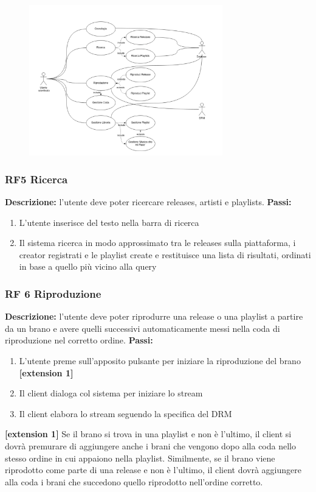 \documentclass[a4paper,12pt]{article}
\begin{document}
\begin{figure}[htp]
    \centering
    \includegraphics[width=0.75\textwidth]{diagrams/use-case-5-6-7-8-9-10-11-12-13.png}
\end{figure}

\subsubsection*{RF5 Ricerca}
\textbf{Descrizione:} l’utente deve poter ricercare releases, artisti e playlists. \newline
\textbf{Passi:}
\begin{enumerate}
    \item L’utente inserisce del testo nella barra di ricerca
    \item Il sistema ricerca in modo approssimato tra le releases sulla piattaforma, i creator registrati e le playlist create e restituisce una lista di risultati, ordinati in base a quello più vicino alla query
\end{enumerate}

\subsubsection*{RF 6 Riproduzione}

\textbf{Descrizione:} l’utente deve poter riprodurre una release o una playlist a partire da un brano e avere quelli successivi automaticamente messi nella coda di riproduzione nel corretto ordine. \newline
\textbf{Passi:}
\begin{enumerate}
    \item L’utente preme sull’apposito pulsante per iniziare la riproduzione del brano \textbf{[extension 1]}
    \item Il client dialoga col sistema per iniziare lo stream
    \item Il client elabora lo stream seguendo la specifica del DRM
\end{enumerate}
\textbf{[extension 1]} Se il brano si trova in una playlist e non è l’ultimo, il client si dovrà premurare di aggiungere anche i brani che vengono dopo alla coda nello stesso ordine in cui appaiono nella playlist. Similmente, se il brano viene riprodotto come parte di una release e non è l’ultimo, il client dovrà aggiungere alla coda i brani che succedono quello riprodotto nell’ordine corretto.
\end{document}
